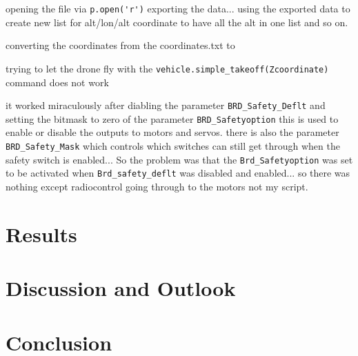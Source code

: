 \documentclass[svgnames]{article}
\begin{document}
	opening the file via \lstinline|p.open('r')|
	exporting the data...
	using the exported data to create new list for alt/lon/alt coordinate to have all the alt in one list and so on.
	
	
	converting the coordinates from the coordinates.txt to 
	
	trying to let the drone fly with the \lstinline|vehicle.simple_takeoff(Zcoordinate)| command does not work
	
	it worked miraculously after diabling the parameter \lstinline|BRD_Safety_Deflt| and setting the bitmask to zero of the parameter \lstinline|BRD_Safetyoption| 
	this is used to enable or disable the outputs to motors and servos. there is also the parameter \lstinline|BRD_Safety_Mask| which controls which switches can still get through when the safety switch is enabled... So the problem was that the \lstinline|Brd_Safetyoption| was set to be activated when \lstinline|Brd_safety_deflt| was disabled and enabled... so there was nothing except radiocontrol going through to the motors not my script.
	
	\section{Results}
	\section{Discussion and Outlook}
	\section{Conclusion}
	
	\appendix
	\printbibliography[
		heading=bibintoc,
		title={Bibliography}
	]
	\listoftables
	\listoffigures	

	\printglossary[type=\acronymtype]
	
\end{document}
